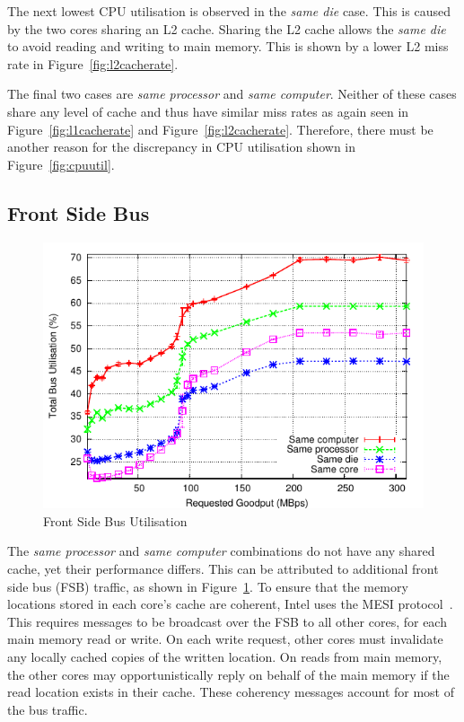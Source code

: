\documentclass[conference, compsoc]{IEEEtran}
\begin{document}
The next lowest CPU utilisation is observed in the \emph{same die} case. This is caused by the two cores sharing an L2 cache. Sharing the L2 cache allows the \emph{same die} to avoid reading and writing to main memory. This is shown by a lower L2 miss rate in Figure~\ref{fig:l2cacherate}.

The final two cases are \emph{same processor} and \emph{same computer}. Neither of these cases share any level of cache and thus have similar miss rates as again seen in Figure~\ref{fig:l1cacherate} and Figure~\ref{fig:l2cacherate}. Therefore, there must be another reason for the discrepancy in CPU utilisation shown in Figure~\ref{fig:cpuutil}.

\subsection{Front Side Bus}
\begin{figure}[tb]
    \begin{center}
       \includegraphics[height=0.65\columnwidth]{Graphs/intel/two_machines/requested_goodput_vs_BUS_UTIL}
    \end{center}
    \caption{Front Side Bus Utilisation}
    \label{fig:FSBUtilisation}
\end{figure}

The \emph{same processor} and \emph{same computer} combinations do not have any shared cache, yet their performance differs. This can be attributed to additional front side bus (FSB) traffic, as shown in Figure~\ref{fig:FSBUtilisation}. To ensure that the memory locations stored in each core's cache are coherent, Intel uses the MESI protocol~\cite{808204}. This requires messages to be broadcast over the FSB to all other cores, for each main memory read or write. On each write request, other cores must invalidate any locally cached copies of the written location. On reads from main memory, the other cores may opportunistically reply on behalf of the main memory if the read location exists in their cache. These coherency messages account for most of the bus traffic.
\end{document}
